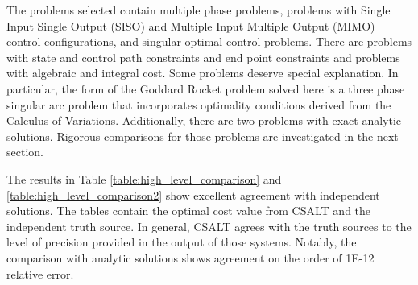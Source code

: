 \documentclass[ISTS  ]{tjsass} %
\begin{document}
The problems selected contain multiple phase problems, problems with Single Input Single Output (SISO) and Multiple Input Multiple Output (MIMO) control configurations, and singular optimal control problems.  There are problems with state and control path constraints and end point constraints and problems with algebraic and integral cost.  Some problems deserve special explanation.  In particular, the form of the Goddard Rocket problem solved here is a three phase singular arc problem that incorporates optimality conditions derived from the Calculus of Variations.  Additionally, there are two problems with exact analytic solutions. Rigorous comparisons for those problems are investigated in the next section.

The results in Table \ref{table:high_level_comparison} and  \ref{table:high_level_comparison2} show excellent agreement with independent solutions.  The tables contain the optimal cost value from CSALT and the independent truth source.   In general, CSALT agrees with the truth sources to the level of precision provided in the output of those systems.  Notably, the comparison with analytic solutions shows agreement on the order of 1E-12 relative error.
%
\end{document}
